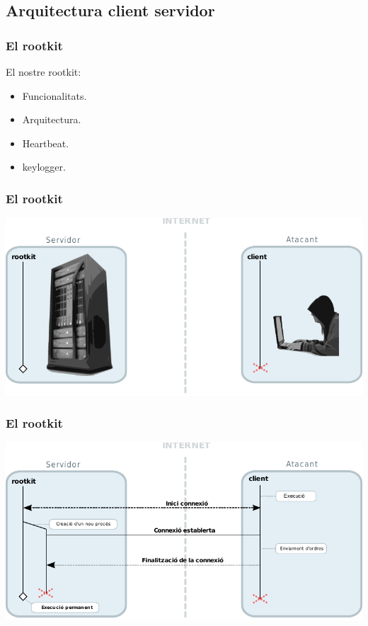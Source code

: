 \documentclass{beamer}
\begin{document}
 
\subsection{Arquitectura client servidor}

\begin{frame}
    \frametitle{El rootkit}
	\begin{block}{El nostre rootkit:}
		\begin{itemize}
			\item Funcionalitats.
			\item \alert{Arquitectura.}
			\item Heartbeat.
			\item keylogger.
		\end{itemize}
	\end{block}
\end{frame}

\begin{frame}
	\frametitle{El rootkit}
	\includegraphics[scale=0.8,keepaspectratio]{arquitectura1.pdf}
\end{frame}

\begin{frame}
	\frametitle{El rootkit}
	\includegraphics[scale=0.8,keepaspectratio]{arquitectura2.pdf}
\end{frame}
\end{document}
